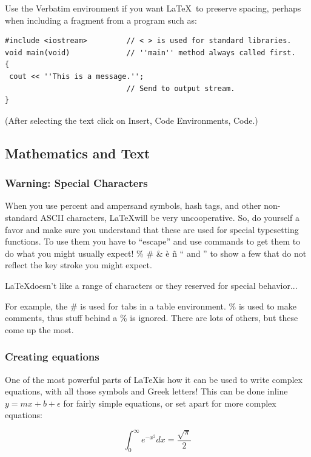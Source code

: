 \documentclass{book}\usepackage{knitr}
\begin{document}
Use the Verbatim environment if you want \LaTeX\ to preserve spacing, perhaps when
including a fragment from a program such as:
\begin{verbatim}
#include <iostream>         // < > is used for standard libraries.
void main(void)             // ''main'' method always called first.
{
 cout << ''This is a message.'';
                            // Send to output stream.
}
\end{verbatim}
(After selecting the text click on Insert, Code Environments, Code.)


\subsection*{Mathematics and Text}

\subsubsection{Warning: Special Characters}

When you use percent and ampersand symbols, hash tags, and other non-standard ASCII characters, \LaTeX will be very uncooperative. So, do yourself a favor and make sure you understand that these are used for special typesetting functions. To use them you have to ``escape'' and use commands to get them to do what you might usually expect!  \% \# \& \`e \~n `` and '' to show a few that do not reflect the key stroke you might expect. 

\LaTeX doesn't like a range of characters or they reserved for special behavior...

For example, the \# is used for tabs in a table environment. \% is used to make comments, thus stuff behind a \% is ignored. There are lots of others, but these come up the most.

\subsubsection{Creating equations}

One of the most powerful parts of \LaTeX is how it can be used to write complex equations, with all those symbols and Greek letters! This can be done inline $y = mx + b + \epsilon$ for fairly simple equations, or set apart for more complex equations:

\begin{equation}
\int_0^\infty e^{-x^2} dx=\frac{\sqrt{\pi}}{2}
\end{equation}
\end{document}
